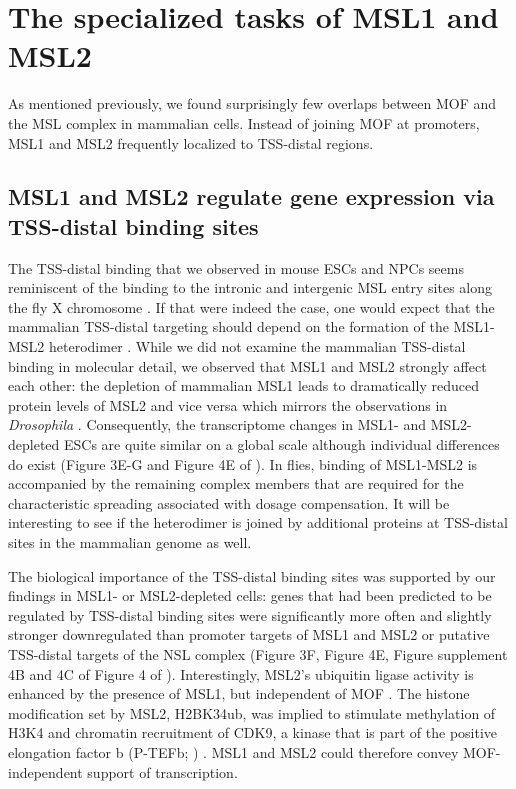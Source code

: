 \section{The specialized tasks of MSL1 and MSL2}
As mentioned previously, we found surprisingly few overlaps between MOF and the MSL complex in mammalian cells. Instead of joining MOF at promoters, MSL1 and MSL2 frequently localized to TSS-distal regions. 
%
\subsection{MSL1 and MSL2 regulate gene expression via TSS-distal binding sites}
%
The TSS-distal binding that we observed in mouse ESCs and NPCs seems reminiscent of the binding to the intronic and intergenic MSL entry sites along the fly X chromosome \citep{Alekseyenko2008, Straub2008}. If that were indeed the case, one would expect that the mammalian TSS-distal targeting should depend on the formation of the MSL1-MSL2 heterodimer \citep{Hallacli2012}. While we did not examine the mammalian TSS-distal binding in molecular detail, we observed that MSL1 and MSL2 strongly affect each other: the depletion of mammalian MSL1 leads to dramatically reduced protein levels of MSL2 and vice versa which mirrors the observations in \textit{Drosophila} \citep{Kelley1995}. Consequently, the transcriptome changes in MSL1- and MSL2-depleted ESCs are quite similar on a global scale although individual differences do exist (Figure 3E-G and Figure 4E of ). In flies, binding of MSL1-MSL2 is accompanied by the remaining complex members that are required for the characteristic spreading associated with dosage compensation. It will be interesting to see if the heterodimer is joined by additional proteins at TSS-distal sites in the mammalian genome as well.

The biological importance of the TSS-distal binding sites was supported by our findings in MSL1- or MSL2-depleted cells: genes that had been predicted to be regulated by TSS-distal binding sites were significantly more often and slightly stronger downregulated than promoter targets of MSL1 and MSL2 or putative TSS-distal targets of the NSL complex (Figure 3F, Figure 4E, Figure supplement 4B and 4C of Figure 4 of ). Interestingly, MSL2's ubiquitin ligase activity is enhanced by the presence of MSL1, but independent of MOF \citep{Wu2011}. The histone modification set by MSL2, H2BK34ub, was implied to stimulate methylation of H3K4 \citep{Wu2011} and chromatin recruitment of CDK9, a kinase that is part of the positive elongation factor b (P-TEFb; ) \citep{Wu2014}. MSL1 and MSL2 could therefore convey MOF-independent support of transcription.

